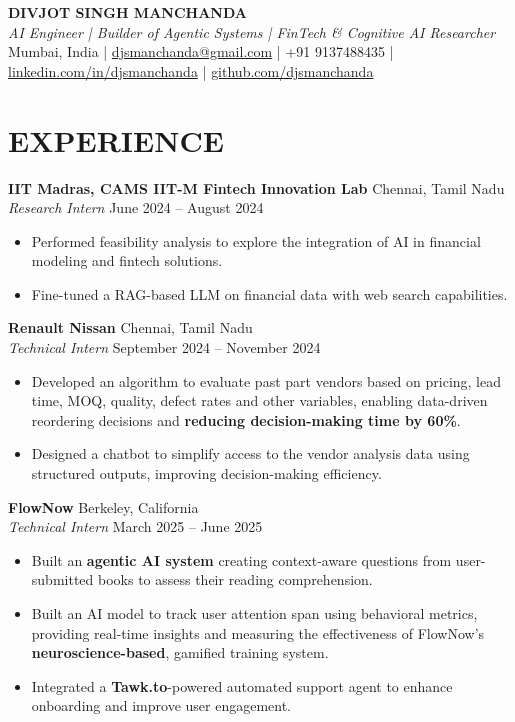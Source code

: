 \documentclass[a4paper,9pt]{extarticle}
\begin{document}
\pagestyle{empty}

\begin{center}
\textbf{\Large DIVJOT SINGH MANCHANDA}\\[3pt]
\textit{AI Engineer | Builder of Agentic Systems | FinTech \& Cognitive AI Researcher}\\[2pt]
Mumbai, India | \href{mailto:djsmanchanda@gmail.com}{djsmanchanda@gmail.com} | +91 9137488435 | \href{https://www.linkedin.com/in/djsmanchanda}{linkedin.com/in/djsmanchanda} |  \href{https://github.com/djsmanchanda}{github.com/djsmanchanda} %
\end{center}

\section*{EXPERIENCE}
\noindent
\textbf{IIT Madras, CAMS IIT-M Fintech Innovation Lab} \hfill Chennai, Tamil Nadu\\ %
\textit{Research Intern} \hfill June 2024 – August 2024 %
\begin{itemize}
    \item Performed feasibility analysis to explore the integration of AI in financial modeling and fintech solutions.
    \item Fine-tuned a RAG-based LLM on financial data with web search capabilities.
\end{itemize}

\noindent
\textbf{Renault Nissan} \hfill Chennai, Tamil Nadu\\ %
\textit{Technical Intern} \hfill September 2024 – November 2024 %
\begin{itemize}
    \item Developed an algorithm to evaluate past part vendors based on pricing, lead time, MOQ, quality, defect rates and other variables, enabling data-driven reordering decisions and \textbf{reducing decision-making time by 60\%}.
    \item Designed a chatbot to simplify access to the vendor analysis data using structured outputs, improving decision-making efficiency.
\end{itemize}

\noindent
\textbf{FlowNow} \hfill Berkeley, California\\ %
\textit{Technical Intern} \hfill March 2025 – June 2025 %
\begin{itemize}
    \item Built an \textbf{agentic AI system} creating context-aware questions from user-submitted books to assess their reading comprehension.
    \item Built an AI model to track user attention span using behavioral metrics, providing real-time insights and measuring the effectiveness of FlowNow's \textbf{neuroscience-based}, gamified training system.
    \item Integrated a \textbf{Tawk.to}-powered automated support agent to enhance onboarding and improve user engagement.
\end{itemize}
\end{document}

